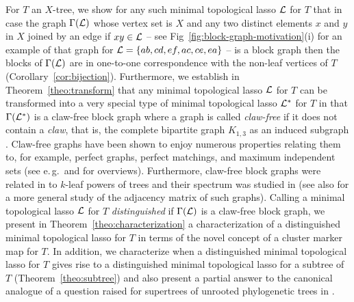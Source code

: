 For $T$ an $X$-tree, we show for any such minimal topological
lasso ${\mathcal L}$ for $T$ that in case the graph $\Gamma({\mathcal L})$ whose
vertex set is $X$ and any two distinct elements $x$ and $y$
in $X$ joined by an edge if $xy\in {\mathcal L}$ -- see
Fig~\ref{fig:block-graph-motivation}(i) for an example of
that graph for ${\mathcal L}=\{ab,cd,ef,ac,ce,ea\}$ -- is a block
graph then the blocks of $\Gamma({\mathcal L})$ are in 
one-to-one correspondence with
the non-leaf vertices of $T$ (Corollary~\ref{cor:bijection}). 
Furthermore, we establish in Theorem~\ref{theo:transform}
that any minimal topological lasso ${\mathcal L}$ for $T$ can be transformed
into a very special type of minimal topological lasso ${\mathcal L}^*$
for $T$ in that $\Gamma({\mathcal L}^*)$
is a claw-free block graph where a graph is called
{\em claw-free} if it does not contain a {\em claw}, that is, 
the complete bipartite graph $K_{1,3}$ as an induced subgraph \cite{H72}.
Claw-free graphs have been shown to enjoy numerous properties relating
them to, for example, perfect graphs, perfect matchings, 
and maximum independent sets
(see e.\,g.\,\cite{FFZ97} and \cite{CFHV12} for overviews).  
Furthermore, claw-free block graphs were related in
\cite{BL09} to $k$-leaf powers of trees and their spectrum
was studied in \cite{GS01, MSST06} (see also
\cite{BR13} for a more general study of the adjacency matrix
of such graphs). 
Calling a minimal topological lasso ${\mathcal L}$ for $T$ {\em distinguished}
if $\Gamma({\mathcal L})$ is a claw-free block graph,
we present in Theorem~\ref{theo:characterization}
a characterization of a distinguished
minimal topological lasso for $T$  in terms of the novel
concept of a cluster marker
map for $T$. In addition, we characterize when a
distinguished minimal topological lasso for $T$ 
gives rise to a distinguished minimal topological
lasso for a subtree of $T$ (Theorem~\ref{theo:subtree})
and also present a partial answer to the canonical
analogue of a question raised for supertrees of unrooted
phylogenetic trees in \cite{DHS11}.

